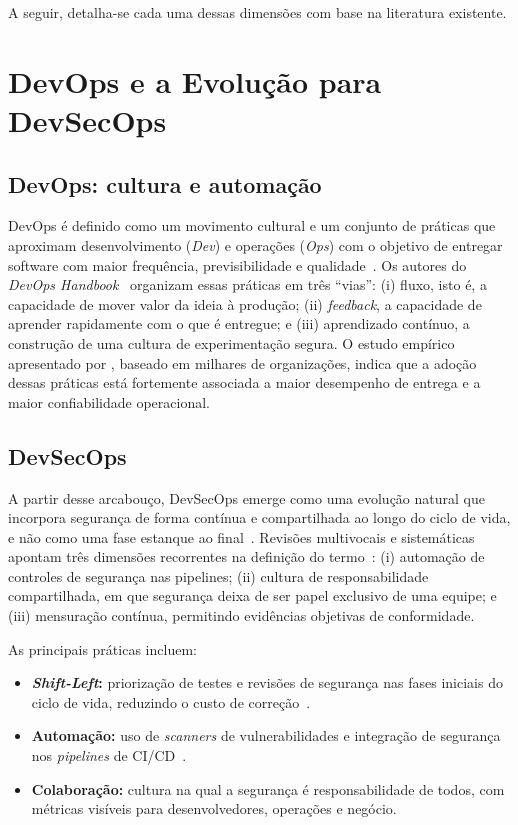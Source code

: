 A seguir, detalha-se cada uma dessas dimensões com base na literatura existente.

\section{DevOps e a Evolução para DevSecOps}

\subsection{DevOps: cultura e automação}

DevOps é definido como um movimento cultural e um conjunto de práticas que aproximam desenvolvimento (\textit{Dev}) e operações (\textit{Ops}) com o objetivo de entregar software com maior frequência, previsibilidade e qualidade~. Os autores do \textit{DevOps Handbook}~ organizam essas práticas em três ``vias'': (i) fluxo, isto é, a capacidade de mover valor da ideia à produção; (ii) \textit{feedback}, a capacidade de aprender rapidamente com o que é entregue; e (iii) aprendizado contínuo, a construção de uma cultura de experimentação segura. O estudo empírico apresentado por , baseado em milhares de organizações, indica que a adoção dessas práticas está fortemente associada a maior desempenho de entrega e a maior confiabilidade operacional.

\subsection{DevSecOps}

A partir desse arcabouço, DevSecOps emerge como uma evolução natural que incorpora segurança de forma contínua e compartilhada ao longo do ciclo de vida, e não como uma fase estanque ao final~. Revisões multivocais e sistemáticas apontam três dimensões recorrentes na definição do termo~: (i) automação de controles de segurança nas pipelines; (ii) cultura de responsabilidade compartilhada, em que segurança deixa de ser papel exclusivo de uma equipe; e (iii) mensuração contínua, permitindo evidências objetivas de conformidade.

As principais práticas incluem:

\begin{itemize}
    \item \textbf{\textit{Shift-Left}:} priorização de testes e revisões de segurança nas fases iniciais do ciclo de vida, reduzindo o custo de correção~.
    \item \textbf{Automação:} uso de \textit{scanners} de vulnerabilidades e integração de segurança nos \textit{pipelines} de CI/CD~.
    \item \textbf{Colaboração:} cultura na qual a segurança é responsabilidade de todos, com métricas visíveis para desenvolvedores, operações e negócio.
\end{itemize}

